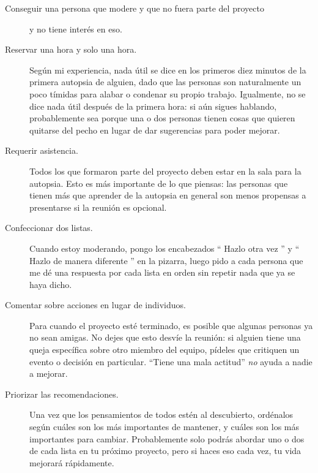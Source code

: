 \begin{description}

\item[Conseguir una persona que modere y que no fuera parte del proyecto]
  y no tiene interés en eso.

\item[Reservar una hora y solo una hora.]
  Según mi experiencia,
  nada útil se dice en los primeros diez minutos de la primera autopsia de alguien,
  dado que las personas son naturalmente un poco tímidas para alabar o condenar su propio trabajo.
  Igualmente,
  no se dice nada útil después de la primera hora:
  si aún sigues hablando,
  probablemente sea porque una o dos personas
  tienen cosas que quieren quitarse del pecho
  en lugar de dar sugerencias para poder mejorar.

\item[Requerir asistencia.]
  Todos los que formaron parte del proyecto deben estar en la sala para la autopsia.
  Esto es más importante de lo que piensas:
  las personas que tienen más que aprender de la autopsia
  en general son menos propensas a presentarse si la reunión es opcional.

\item[Confeccionar dos listas.]
  Cuando estoy moderando,
  pongo los encabezados `` Hazlo otra vez '' y `` Hazlo de manera diferente '' en la pizarra,
  luego pido a cada persona que me dé una respuesta por cada lista en orden 
  sin repetir nada que ya se haya dicho.

\item[Comentar sobre acciones en lugar de individuos.]
  Para cuando el proyecto esté terminado,
  es posible que algunas personas ya no sean amigas.
  No dejes que esto desvíe la reunión:
  si alguien tiene una queja específica sobre otro miembro del equipo,
  pídeles que critiquen un evento o decisión en particular.
  ``Tiene una mala actitud'' \emph{no} ayuda a nadie a mejorar.

\item[Priorizar las recomendaciones.]
  Una vez que los pensamientos de todos estén al descubierto,
  ordénalos según cuáles son los más importantes de mantener,
  y cuáles son los más importantes para cambiar.
  Probablemente solo podrás abordar uno o dos de cada lista en tu próximo proyecto,
  pero si haces eso cada vez,
  tu vida mejorará rápidamente.

\end{description}
